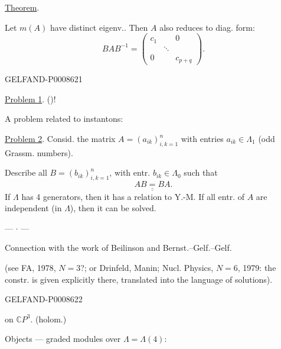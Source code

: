 \uline{Theorem}.

Let \(m(A)\) have distinct eigenv.. Then \(A\) also reduces to diag. form:
\[
BAB^{-1}=\begin{pmatrix}c_1&&0\\&\ddots&\\0&&c_{p+q}\end{pmatrix}.\tag{10}
\]


\begin{GelfandAdjacentEvidence}{GELFAND-P000862}{1}

\uline{Problem 1}.  ()!

A problem related to instantons:

\uline{Problem 2}. Consid. the matrix \(A=(a_{ik})_{i,k=1}^{n}\) with entries
\(a_{ik}\in\Lambda_1\) (odd Grassm. numbers).

Describe all \(B=(b_{ik})_{i,k=1}^{n}\), with entr. \(b_{ik}\in\Lambda_0\) such that
\[
\underline{\underline{AB=BA}}.
\]
If \(\Lambda\) has 4 generators, then it has a relation to Y.-M.
If all entr. of \(A\) are independent (in \(\Lambda\)), then it can be solved.
\begin{center}— \(\cdot\) —\end{center}

 Connection with the work of Beilinson and Bernst.–Gelf.–Gelf.

(see FA, 1978, \(N=3\)?; or Drinfeld, Manin; Nucl. Physics, \(N=6\), 1979:
the constr. is given explicitly there, translated into the language of solutions).
\end{GelfandAdjacentEvidence}
\begin{GelfandAdjacentEvidence}{GELFAND-P000862}{2}


 on \(\mathbb C P^3\). (holom.)

Objects — graded modules over \(\Lambda=\Lambda(4)\):
\end{GelfandAdjacentEvidence}
